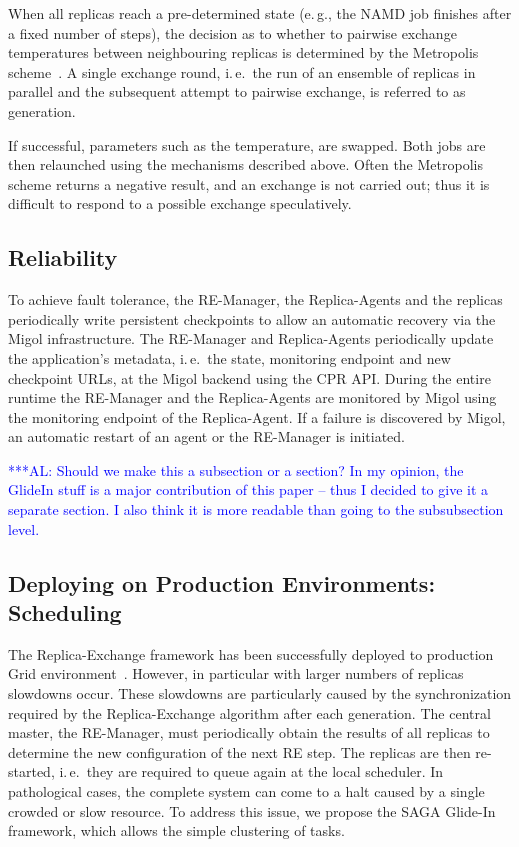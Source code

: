 \documentclass{rspublic}
\newcommand{\alnote}[1]{ {\textcolor{blue} { ***AL: #1 }}}
\newcommand{\alnote}[1]{}
\newcommand{\remanager}[1]{RE-Manager }
\begin{document}
When all replicas reach a pre-determined state (e.\,g., the NAMD job finishes 
after a fixed number of steps), the decision as to whether to pairwise 
exchange temperatures between neighbouring replicas
is determined by the Metropolis scheme~\citep{metropolis:1087}.    
A single exchange round, i.\,e.\ the run of an ensemble of
replicas in parallel and the subsequent attempt to pairwise
exchange, is referred to as generation.                                                         

If successful, parameters such as the temperature, are swapped. Both jobs are then
relaunched using the mechanisms described above. Often the Metropolis
scheme returns a negative result, and an exchange is not carried out;
thus it is difficult to respond to a possible exchange speculatively. 


\subsection{Reliability}
To achieve fault tolerance, the RE-Manager, the Replica-Agents and the
replicas periodically write persistent checkpoints to allow
an automatic recovery via the Migol infrastructure. The \remanager\
and Replica-Agents periodically update the application's metadata,
i.\,e.\ the state, monitoring endpoint and new checkpoint URLs, at the
Migol backend using the CPR API. During the entire runtime the
\remanager\ and the Replica-Agents are monitored by Migol using the
monitoring endpoint of the Replica-Agent. If a failure is discovered
by Migol, an automatic restart of an agent or the RE-Manager is
initiated.

\alnote{Should we make this a subsection or a section? In my opinion,
the GlideIn stuff is a major contribution of this paper -- thus I decided to
give it a separate section. I also think it is more readable than going to the
subsubsection level.}           

\subsection{Deploying on Production Environments: Scheduling}

The Replica-Exchange framework has been successfully deployed to production
Grid environment~\citep{Luckow:2008la}. However, in particular with larger 
numbers of replicas slowdowns occur. These slowdowns are 
particularly caused by the synchronization required
by the Replica-Exchange algorithm after each generation. 
The central master, the RE-Manager, must periodically obtain the 
results of all replicas to determine the new configuration of the 
next RE step. The replicas are then re-started, i.\,e.\ they
are required to queue again at the local scheduler. In pathological cases, 
the complete system can come to a halt caused by a single crowded or slow resource. 
To address this issue, we propose the SAGA Glide-In framework, which
allows the simple clustering of tasks. 
\end{document}
